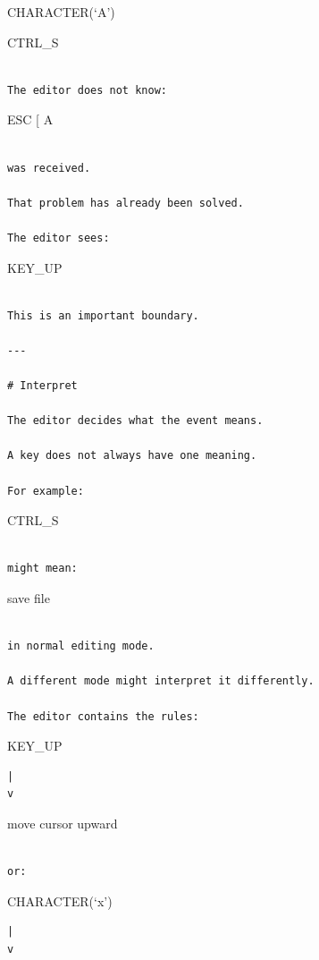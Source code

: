 \documentclass[
  oneside,
  openany]{book}
\begin{document}
CHARACTER(`A')

CTRL\_S

\begin{verbatim}

The editor does not know:
\end{verbatim}

ESC {[} A

\begin{verbatim}

was received.

That problem has already been solved.

The editor sees:
\end{verbatim}

KEY\_UP

\begin{verbatim}

This is an important boundary.

---

# Interpret

The editor decides what the event means.

A key does not always have one meaning.

For example:
\end{verbatim}

CTRL\_S

\begin{verbatim}

might mean:
\end{verbatim}

save file

\begin{verbatim}

in normal editing mode.

A different mode might interpret it differently.

The editor contains the rules:
\end{verbatim}

KEY\_UP

\begin{verbatim}
|
v
\end{verbatim}

move cursor upward

\begin{verbatim}

or:
\end{verbatim}

CHARACTER(`x')

\begin{verbatim}
|
v
\end{verbatim}
\end{document}

